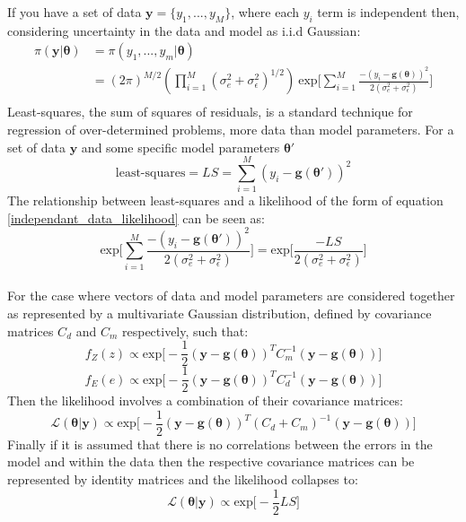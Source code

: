 If you have a set of data $\bm{y} = \{y_1,...,y_M\}$, where each $y_i$ term is independent then, considering uncertainty in the data and model as i.i.d Gaussian:
\begin{equation}
\begin{split}
\pi(\bm{y}|\bm{\theta}) &= \pi(y_1,...,y_m|\bm{\theta})\\
&= (2\pi)^{M/2}(\prod_{i = 1}^{M}(\sigma_{e}^2+\sigma_{\epsilon}^2)^{1/2})\ \text{exp}\bigg[\sum_{i = 1}^{M}\frac{-(y_i-\bm{g}({\bm{\theta}}))^2}{2(\sigma_{e}^2+\sigma_{\epsilon}^2)}\bigg]\\
\label{independant_data_likelihood}
\end{split}
\end{equation}
Least-squares, the sum of squares of residuals, is a standard technique for regression of over-determined problems, more data than model parameters. For a set of data $\bm{y}$ and some specific model parameters $\bm{\theta'}$
\begin{equation}
\text{least-squares} = LS = \sum_{i = 1}^{M} (y_i - \bm{g}(\bm{\theta'}))^2
\end{equation}
The relationship between least-squares and a likelihood of the form of equation \ref{independant_data_likelihood} can be seen as:
\begin{equation}
\text{exp}\bigg[\sum_{i = 1}^{M}\frac{-(y_i-\bm{g}({\bm{\theta'}}))^2}{2(\sigma_{e}^2+\sigma_{\epsilon}^2)}\bigg] = \text{exp}\bigg[\frac{-LS}{2(\sigma_{e}^2+\sigma_{\epsilon}^2)}\bigg]
\end{equation}\\

For the case where vectors of data and model parameters are considered together as represented by a multivariate Gaussian distribution, defined by covariance matrices $C_d$ and $C_m$ respectively, such that:
\begin{equation}
f_Z(z) \propto \text{exp}\bigg[-\frac{1}{2}(\bm{y}-\bm{g}(\bm{\theta}))^TC_m^{-1}(\bm{y}-\bm{g}(\bm{\theta}))\bigg]
\end{equation}
\begin{equation}
f_E(e) \propto \text{exp}\bigg[-\frac{1}{2}(\bm{y}-\bm{g}(\bm{\theta}))^TC_d^{-1}(\bm{y}-\bm{g}(\bm{\theta}))\bigg]
\end{equation}
Then the likelihood involves a combination of their covariance matrices:
\begin{equation}
\mathcal{L}(\bm{\theta}|\bm{y}) \propto \text{exp}\bigg[-\frac{1}{2}(\bm{y}-\bm{g}(\bm{\theta}))^T(C_d+C_m)^{-1}(\bm{y}-\bm{g}(\bm{\theta}))\bigg]
\end{equation}
Finally if it is assumed that there is no correlations between the errors in the model and within the data then the respective covariance matrices can be represented by identity matrices and the likelihood collapses to:
\begin{equation}
\mathcal{L}(\bm{\theta}|\bm{y}) \propto \text{exp}\bigg[-\frac{1}{2}LS\bigg]
\end{equation}